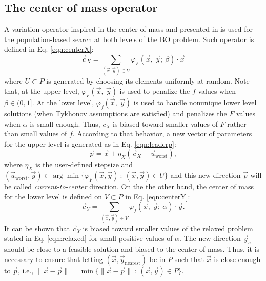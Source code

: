 \documentclass[conference]{IEEEtran}
\theoremstyle{definition}
\begin{document}
\subsection{The center of mass operator} %
\label{sub:the_center_operator}
% 
A variation operator inspired in the center of mass and presented in \cite{Mejia2018}
is used for the population-based search at both levels of the BO problem. Such
operator is defined in Eq. \ref{eqn:centerX}:
% 
\begin{equation}
    \vec{c}_X = \sum_{(\vec{x}, \vec{y})\in U} \varphi_F(\vec{x},\ \vec{y}; \ \beta) \cdot \vec{x}
    \label{eqn:centerX}
\end{equation}
% 
where $U \subset P$ is generated by choosing its elements uniformly at random.
Note that, at the upper level, $\varphi_F (\vec{x},\ \vec{y})$ is used to penalize
the $f$ values when $\beta\in (0, 1]$. At the lower level, $\varphi_f (\vec{x},\ \vec{y})$
is used to handle nonunique lower level solutions (when Tykhonov assumptions are 
satisfied) and penalizes the $F$ values when $\alpha$ is small enough. Thus, $c_X$
is biased toward smaller values of $F$ rather than small values of $f$. According
to that behavior, a new vector of parameters for the upper level is generated as
in Eq. \ref{eqn:leaderp}:
% 
\begin{equation}
    \vec{p} = \vec{x} + \eta_{X} (\vec{c}_X - \vec{u}_{\text{worst}}),
    \label{eqn:leaderp}
\end{equation}
% 
where $\eta_{X}$ is the user-defined stepsize and  
$
    (\vec{u}_{\text{worst}}, \vec{y}) \in \arg \min \{\varphi_F(\vec{x}, \vec{y} )  \ : \ (\vec{x}, \vec{y}) \in U \} 
$ %
% 
and this new direction $\vec{p}$ will be called \textit{current-to-center} direction. %
On the the other hand, the center of mass for the lower level is defined on
$V \subset P$ in Eq. \ref{eqn:centerY}:
% 
\begin{equation}
    \vec{c}_Y = \sum_{(\vec{x}, \vec{y})\in V} \varphi_f(\vec{x},\ \vec{y};\ \alpha) \cdot \vec{y}.
    \label{eqn:centerY}
\end{equation}
% 
It can be shown that $\vec{c}_Y$ is biased toward smaller values of the relaxed
problem stated in Eq. \ref{eqn:relaxed} for small positive values of $\alpha$.
% 
The new direction $\vec{y}_c$ should be close to a feasible solution and biased
to the center of mass. Thus, it is necessary to ensure that letting $(\vec{x}, \vec{y}_{\text{nearest}}) $
be in $P$ such that $\vec{x}$ is close enough to $\vec{p}$, i.e., $ \| \vec{x} - \vec{p} \| = \min\{ \| \vec{x} - \vec{p} \| \ : \ (\vec{x}, \vec{y}) \in P  \} $.
\end{document}
